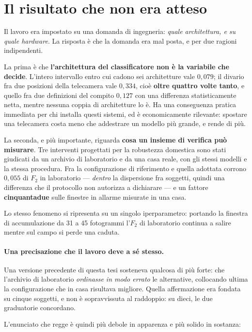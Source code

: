 \section{Il risultato che non era atteso}
\label{sec:risultato-inatteso}

Il lavoro era impostato su una domanda di ingegneria: \emph{quale architettura, e su quale hardware}. La risposta è che la domanda era mal posta, e per due ragioni indipendenti.

La prima è che \textbf{l'architettura del classificatore non è la variabile che decide}. L'intero intervallo entro cui cadono sei architetture vale $0{,}079$; il divario fra due posizioni della telecamera vale $0{,}334$, cioè \textbf{oltre quattro volte tanto}, e quello fra due definizioni del compito $0{,}127$ con una differenza statisticamente netta, mentre nessuna coppia di architetture lo è. Ha una conseguenza pratica immediata per chi installa questi sistemi, ed è economicamente rilevante: spostare una telecamera costa meno che addestrare un modello più grande, e rende di più.

La seconda, e più importante, riguarda \textbf{cosa un insieme di verifica può
misurare}. Tre interventi progettati per la robustezza domestica sono stati
giudicati da un archivio di laboratorio e da una casa reale, con gli stessi
modelli e la stessa procedura. Fra la configurazione di riferimento e quella
adottata corrono $0{,}055$ di $F_2$ in laboratorio --- \emph{dentro} la
dispersione fra soggetti, quindi una differenza che il protocollo non
autorizza a dichiarare --- e un fattore \textbf{cinquantadue} sulle finestre in
allarme misurate in una casa.

Lo stesso fenomeno si ripresenta su un singolo iperparametro: portando la
finestra di accumulazione da 31 a 45 fotogrammi l'$F_2$ di laboratorio
continua a salire mentre sul campo si perde una caduta.

\paragraph{Una precisazione che il lavoro deve a sé stesso.} Una versione
precedente di questa tesi sosteneva qualcosa di più forte: che l'archivio di
laboratorio \emph{ordinasse in modo errato} le alternative, collocando ultima
la configurazione che in casa risultava migliore. Quella affermazione era
fondata su cinque soggetti, e non è sopravvissuta al raddoppio: su dieci, le
due graduatorie concordano.

L'enunciato che regge è quindi più debole in apparenza e più solido in
sostanza:

